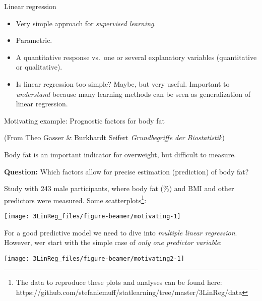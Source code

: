 \documentclass[10pt,ignorenonframetext,]{beamer}
\begin{document}
\begin{frame}{Linear regression}
\protect\hypertarget{linear-regression}{}

\begin{itemize}
\item
  Very simple approach for \emph{supervised learning}.
\item
  Parametric.
\item
  A quantitative response vs.~one or several explanatory variables
  (quantitative or qualitative).
\item
  Is linear regression too simple? Maybe, but very useful. Important to
  \emph{understand} because many learning methods can be seen as
  generalization of linear regression.
\end{itemize}

\end{frame}

\begin{frame}

\begin{block}{Motivating example: Prognostic factors for body fat}

\tiny(From Theo Gasser \& Burkhardt Seifert \emph{Grundbegriffe der
Biostatistik})

\vspace{2mm}
\normalsize

Body fat is an important indicator for overweight, but difficult to
measure.

\vspace{2mm}

\textbf{Question:} Which factors allow for precise estimation
(prediction) of body fat?

\vspace{2mm}

Study with 243 male participants, where body fat (\%) and BMI and other
predictors were measured. Some
scatterplots\footnote{The data to reproduce these plots and analyses can be found here: https://github.com/stefaniemuff/statlearning/tree/master/3LinReg/data}:

\begin{center}\texttt{[image: 3LinReg\_files/figure-beamer/motivating-1]} \end{center}

\end{block}

\end{frame}

\begin{frame}

For a good predictive model we need to dive into \emph{multiple linear
regression}. However, wer start with the simple case of \emph{only one
predictor variable}:

\begin{center}\texttt{[image: 3LinReg\_files/figure-beamer/motivating2-1]} \end{center}

\end{frame}
\end{document}
